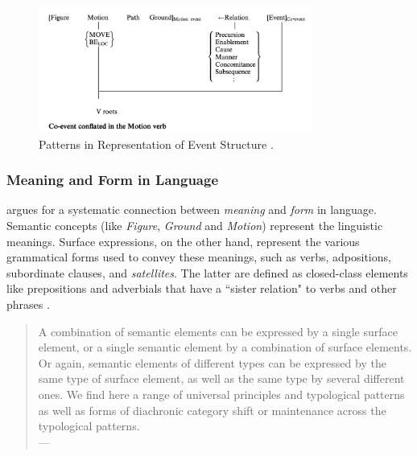 {\normalsize{

\begin{figure}[htb]
\centering
\includegraphics[width=0.8\textwidth]{figuras/Screen Shot 2024-05-17 at 13.01.00.png}
\caption{\label{fig:patterns-events} Patterns in Representation of Event Structure  \parencite[28]{talmy2000towardb}.}
\end{figure}


\subsubsection{Meaning and Form in Language}

\textcite[21]{talmy2000towardb} argues for a systematic connection between \textit{meaning} and \textit{form} in language. Semantic concepts (like \emph{Figure}, \emph{Ground} and \emph{Motion}) represent the linguistic meanings. Surface expressions, on the other hand, represent the various grammatical forms used to convey these meanings, such as verbs, adpositions, subordinate clauses, and \emph{satellites}. The latter are defined as closed-class elements like prepositions and adverbials that have a ``sister relation" to verbs and other phrases \parencite{oliveira2022expressing}.
 
\begin{quote}
A combination of semantic elements can be expressed by a single surface element, or a single semantic element by a combination of surface elements. Or again, semantic elements of different types can be expressed by the same type of surface element, as well as the same type by several different ones. We find here a range of universal principles and typological patterns as well as forms of diachronic category shift or maintenance across the typological patterns. \\
\phantom{abc}
\hfill --- \textcite{talmy2000towardb}
\end{quote}

}}
